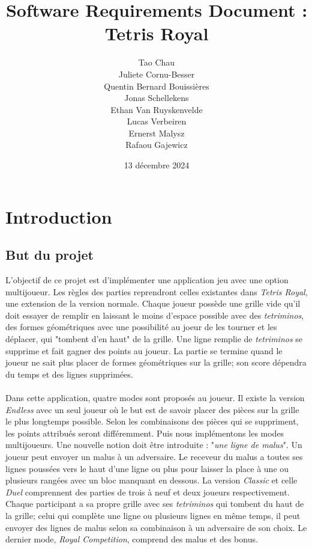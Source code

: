 \documentclass{article}
\title{Software Requirements Document : Tetris Royal}
\author{Tao Chau\\
		Juliete Cornu-Besser\\
		Quentin Bernard Bouissières\\
		Jonas Schellekens\\
		Ethan Van Ruyskenvelde\\
		Lucas Verbeiren\\
		Ernerst Malysz\\
		Rafaou Gajewicz}
\date{ 13 décembre 2024}
\begin{document}
\maketitle

\newpage

\tableofcontents

\newpage

\section{Introduction}

\subsection{But du projet}

\quad L'objectif de ce projet est d'implémenter une application jeu avec une option multijoueur. Les règles des parties reprendront celles existantes dans \textit{Tetris Royal}, une extension de la version normale. Chaque joueur possède une grille vide qu'il doit essayer de remplir en laissant le moins d'espace possible avec des \textit{tetriminos}, des formes géométriques avec une possibilité au joeur de les tourner et les déplacer, qui "tombent d'en haut" de la grille. Une ligne remplie de  \textit{tetriminos} se supprime et fait gagner des points au joueur. La partie se termine quand le joueur ne sait plus placer de formes géométriques sur la grille; son score dépendra du temps et des lignes supprimées.  %
\\ \\
\quad Dans cette application, quatre modes sont proposés au joueur. Il existe la version \textit{Endless} avec un seul joueur où le but est de savoir placer des pièces sur la grille le plus longtemps possible. Selon les combinaisons des pièces qui se suppriment, les points attribués seront différemment. 
Puis nous implémentons les modes multijoueurs. Une nouvelle notion doit être introduite : "\textit{une ligne de malus}". Un joueur peut envoyer un malus à un adversaire. Le receveur du malus a toutes ses lignes poussées vers le haut d'une ligne ou plus pour laisser la place à une ou plusieurs rangées avec un bloc manquant en dessous.  La version \textit{Classic} et celle \textit{Duel} comprennent des parties de trois à neuf et deux joueurs respectivement. Chaque participant a sa propre grille avec ses \textit{tetriminos} qui tombent du haut de la grille; celui qui complète une ligne ou plusieurs lignes en même temps, il peut envoyer des lignes de malus selon sa combinaison à un adversaire de son choix. Le dernier mode, \textit{ Royal Competition}, comprend des malus et des bonus. 
\end{document}
